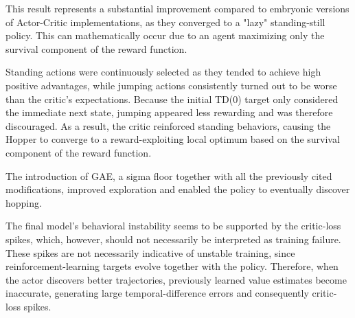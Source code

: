 This result represents a substantial improvement compared to embryonic versions of Actor-Critic implementations, as they 
converged to a "lazy" standing-still policy. This can mathematically occur due to an agent maximizing only the survival component of the reward function.


Standing actions were continuously selected as they tended to achieve high positive advantages, while jumping actions
consistently turned out to be worse than the critic’s expectations. Because the initial TD(0) target only considered
the immediate next state, jumping appeared less rewarding and was therefore discouraged. As a result, the critic
reinforced standing behaviors, causing the Hopper to converge to a reward-exploiting local optimum based on the
survival component of the reward function.


The introduction of GAE, a sigma floor together with all the previously cited modifications, improved exploration and enabled
the policy to eventually discover hopping.

The final model's behavioral instability seems to be supported by the critic-loss spikes, which, however, 
should not necessarily be interpreted as training failure.
These spikes are not necessarily indicative of unstable training, since reinforcement-learning targets evolve together
with the policy. Therefore, when the actor discovers better trajectories, previously learned value estimates become inaccurate,
generating large temporal-difference errors and consequently critic-loss spikes.

